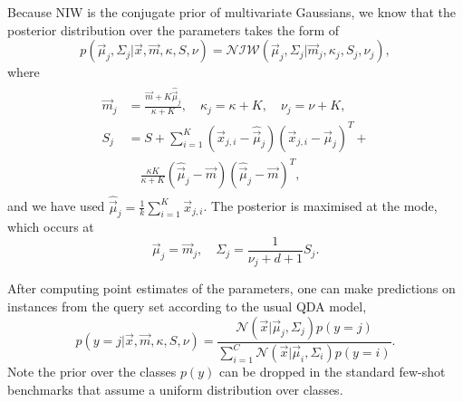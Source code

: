 \documentclass[10pt,twocolumn,letterpaper]{article}
\newcommand{\NIW}{\mathcal{NIW}}
\newcommand{\Gauss}{\mathcal{N}}
\begin{document}
Because NIW is the conjugate prior of multivariate Gaussians, we know that the posterior distribution over the parameters takes the form of
\begin{equation}
    p(\vec \mu_j, \Sigma_j | \vec x, \vec m, \kappa, S, \nu) = \NIW(\vec \mu_j, \Sigma_j | \vec m_j, \kappa_j, S_j, \nu_j),
\end{equation}
where
\begin{align}
\begin{split}
\label{eq:update-rule}
    \vec m_j &= \frac{\vec m + K \hat{\vec \mu}_j}{\kappa + K}, \quad \kappa_j = \kappa + K,\quad \nu_j = \nu + K,  \\
S_j &= S + \sum_{i=1}^K (\vec x_{j,i} - \hat{\vec \mu}_j)(\vec x_{j,i} - \hat{\vec \mu}_j)^T + \\
    &\quad \frac{\kappa K}{\kappa + K} (\hat{\vec \mu}_j - \vec m)(\hat{\vec \mu}_j - \vec m)^T,   \end{split}
\end{align}
and we have used $\hat{\vec \mu}_j = \frac{1}{k}\sum_{i=1}^K \vec x_{j,i}$. The posterior is maximised at the mode, which occurs at
\begin{equation}
    \label{eq:map-parameters}
    \vec \mu_j = \vec m_j, \quad \Sigma_j = \frac{1}{\nu_j + d + 1} S_j.
\end{equation}

After computing point estimates of the parameters, one can make predictions on instances from the query set according to the usual QDA model,
\begin{equation}
    p(y=j | \vec x, \vec m, \kappa, S, \nu) = \frac{\Gauss(\vec x | \vec \mu_j, \Sigma_j) p(y=j)}{\sum_{i=1}^C \Gauss(\vec x | \vec \mu_i, \Sigma_i) p(y=i)}.\label{eq:qda-test}
\end{equation}
Note the prior over the classes $p(y)$ can be dropped in the standard few-shot benchmarks that assume a uniform distribution over classes.
\end{document}
